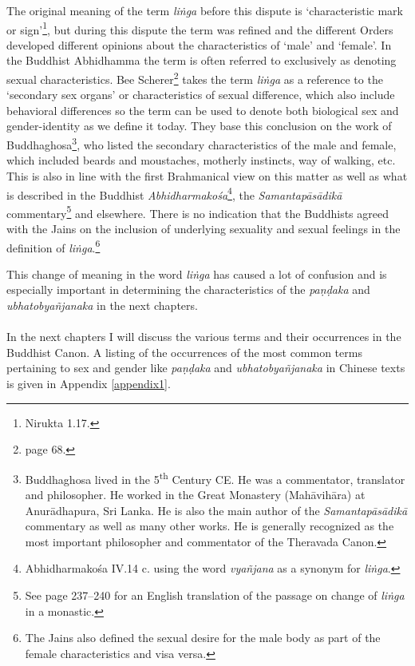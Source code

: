 The original meaning of the term {\em liṅga} before this dispute is `characteristic mark or sign'\footnote{Nirukta 1.17.}, but during this dispute the term was refined and the different Orders developed different opinions about the characteristics of `male' and `female'. In the Buddhist Abhidhamma the term is often referred to exclusively as denoting sexual characteristics. Bee Scherer\footnote{\cite{scherer} page 68.} takes the term {\em liṅga} as a reference to the `secondary sex organs' or characteristics of sexual difference, which also include behavioral differences so the term can be used to denote both biological sex and gender-identity as we define it today. They base this conclusion on the work of Buddhaghosa\footnote{Buddhaghosa lived in the 5\textsuperscript{th} Century CE. He was a commentator, translator and philosopher. He worked in the Great Monastery (Mahāvihāra) at Anurādhapura, Sri Lanka. He is also the main author of the {\em Samantapāsādikā} commentary as well as many other works. He is generally recognized as the most important philosopher and commentator of the Theravada Canon.}, who listed the secondary characteristics of the male and female, which included beards and moustaches, motherly instincts, way of walking, etc. This is also in line with the first Brahmanical view on this matter as well as what is described in the Buddhist {\em Abhidharmakośa}\footnote{Abhidharmakośa IV.14 c. using the word {\em vyañjana} as a synonym for {\em liṅga}.}, the {\em Samantapāsādikā} commentary\footnote{See \cite{anderson2016} page 237–240 for an English translation of the passage on change of {\em liṅga} in a monastic.} and elsewhere. There is no indication that the Buddhists agreed with the Jains on the inclusion of underlying sexuality and sexual feelings in the definition of {\em liṅga}.\footnote{The Jains also defined the sexual desire for the male body as part of the female characteristics and visa versa.}

This change of meaning in the word {\em liṅga} has caused a lot of confusion and is especially important in determining the characteristics of the {\em paṇḍaka} and {\em ubhatob­yañ­janaka} in the next chapters.\\
\\
In the next chapters I will discuss the various terms and their occurrences in the Buddhist Canon. A listing of the occurrences of the most common terms pertaining to sex and gender like {\em paṇḍaka} and {\em ubhatob­yañ­janaka} in Chinese texts is given in Appendix \ref{appendix1}. 
